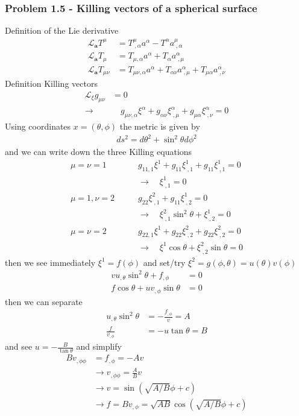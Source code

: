 \documentclass[10pt,a4paper]{article}
\theoremstyle{definition}
\begin{document}
\subsubsection{Problem 1.5 - Killing vectors of a spherical surface}
Definition of the Lie derivative
\begin{align}
\mathcal{L}_\mathbf{a}T^\mu&=T^\mu_{\;,\alpha}a^\alpha-T^\alpha a^\mu_{\;,\alpha}\\
\mathcal{L}_\mathbf{a}T_\mu&=T_{\mu,\alpha}a^\alpha+T_\alpha a^\alpha_{\;,\mu}\\
\mathcal{L}_\mathbf{a}T_{\mu\nu}&=T_{\mu\nu,\alpha}a^\alpha+T_{\alpha\nu} a^\alpha_{\;,\mu}+T_{\mu\alpha} a^\alpha_{\;,\nu}
\end{align}
Definition Killing vectors
\begin{align}
\mathcal{L}_\xi g_{\mu\nu}&=0\\
\rightarrow &\quad g_{\mu\nu,\alpha}\xi^\alpha+g_{\alpha\nu} \xi^\alpha_{\;,\mu}+g_{\mu\alpha} \xi^\alpha_{\;,\nu}=0
\end{align}
Using coordinates $x=(\theta,\phi)$ the metric is given by
\begin{align}
ds^2=d\theta^2+\sin^2\theta d\phi^2
\end{align}
and we can write down the three Killing equations
\begin{align}
\mu=\nu=1\qquad &g_{11,1}\xi^1+g_{11}\xi^1_{\;,1}+g_{11}\xi^1_{\;,1}=0\\
&\rightarrow\quad\xi^1_{\;,1}=0\\
\mu=1, \nu=2\qquad &g_{22}\xi^2_{\;,1}+g_{11}\xi^1_{\;,2}=0\\
&\rightarrow\quad\xi^2_{\;,1}\sin^2\theta+\xi^1_{\;,2}=0\\
\mu=\nu=2\qquad &g_{22,1}\xi^1+g_{22}\xi^2_{\;,2}+g_{22}\xi^2_{\;,2}=0\\
&\rightarrow\quad\xi^1\cos\theta+\xi^2_{\;,2}\sin\theta=0
\end{align}
then we see immediately $\xi^1=f(\phi)$ and set/try $\xi^2=g(\phi,\theta)=u(\theta)v(\phi)$
\begin{align}
vu_{,\theta}\sin^2\theta+f_{,\phi}&=0\\
f\cos\theta+uv_{,\phi}\sin\theta&=0
\end{align}
then we can separate
\begin{align}
u_{,\theta}\sin^2\theta&=-\frac{f_{,\phi}}{v}=A\\
\frac{f}{v_{,\phi}}&=-u\tan\theta=B
\end{align}
and see $u=-\frac{B}{\tan\theta}$ and simplify
\begin{align}
Bv_{,\phi\phi}&=f_{,\phi}=-Av\\
&\rightarrow v_{,\phi\phi}=\frac{A}{B}v\\
&\rightarrow v=\sin(\sqrt{A/B}\phi+c)\\
&\rightarrow f=Bv_{,\phi}=\sqrt{AB}\cos(\sqrt{A/B}\phi+c)
\end{align}
\end{document}
